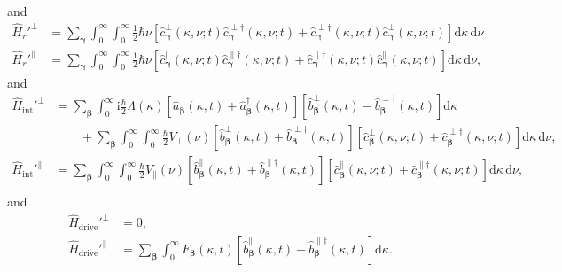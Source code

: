 \documentclass{article}
\begin{document}
and
\begin{equation}
\begin{split}
\hat{H}_r'^\perp &= \sum_{\bm{\gamma}}\int_0^\infty\int_0^\infty\frac{1}{2}\hbar\nu\left[\hat{c}_{\bm{\gamma}}^\perp(\kappa,\nu;t)\hat{c}_{\bm{\gamma}}^{\perp\dagger}(\kappa,\nu;t) + \hat{c}_{\bm{\gamma}}^{\perp\dagger}(\kappa,\nu;t)\hat{c}_{\bm{\gamma}}^\perp(\kappa,\nu;t)\right]\mathrm{d}\kappa\,\mathrm{d}\nu\\
\hat{H}_r'^\parallel &= \sum_{\bm{\gamma}}\int_0^\infty\int_0^\infty\frac{1}{2}\hbar\nu\left[\hat{c}_{\bm{\gamma}}^\parallel(\kappa,\nu;t)\hat{c}_{\bm{\gamma}}^{\parallel\dagger}(\kappa,\nu;t) + \hat{c}_{\bm{\gamma}}^{\parallel\dagger}(\kappa,\nu;t)\hat{c}_{\bm{\gamma}}^\parallel(\kappa,\nu;t)\right]\mathrm{d}\kappa\,\mathrm{d}\nu,
\end{split}
\end{equation}
and
\begin{equation}
\begin{split}
\hat{H}_\mathrm{int}'^\perp &=  \sum_{\bm{\beta}}\int_0^\infty\mathrm{i}\frac{\hbar}{2}\Lambda(\kappa)\left[\hat{a}_{\bm{\beta}}(\kappa,t) + \hat{a}_{\bm{\beta}}^\dagger(\kappa,t)\right]\left[\hat{b}_{\bm{\beta}}^\perp(\kappa,t) - \hat{b}_{\bm{\beta}}^{\perp\dagger}(\kappa,t)\right]\mathrm{d}\kappa\\
&\qquad + \sum_{\bm{\beta}}\int_0^\infty\int_0^\infty\frac{\hbar}{2}V_\perp(\nu)\left[\hat{b}_{\bm{\beta}}^\perp(\kappa,t) + \hat{b}_{\bm{\beta}}^{\perp\dagger}(\kappa,t)\right]\left[\hat{c}_{\bm{\beta}}^\perp(\kappa,\nu;t) + \hat{c}_{\bm{\beta}}^{\perp\dagger}(\kappa,\nu;t)\right]\mathrm{d}\kappa\,\mathrm{d}\nu,\\[1.0em]
\hat{H}_\mathrm{int}'^\parallel &=  \sum_{\bm{\beta}}\int_0^\infty\int_0^\infty\frac{\hbar}{2}V_\parallel(\nu)\left[\hat{b}_{\bm{\beta}}^\parallel(\kappa,t) + \hat{b}_{\bm{\beta}}^{\parallel\dagger}(\kappa,t)\right]\left[\hat{c}_{\bm{\beta}}^\parallel(\kappa,\nu;t) + \hat{c}_{\bm{\beta}}^{\parallel\dagger}(\kappa,\nu;t)\right]\mathrm{d}\kappa\,\mathrm{d}\nu,\\
\end{split}
\end{equation}
and
\begin{equation}
\begin{split}
\hat{H}_\mathrm{drive}'^\perp &= 0,\\
\hat{H}_\mathrm{drive}'^\parallel &= \sum_{\bm{\beta}}\int_0^\infty F_{\bm{\beta}}(\kappa,t)\left[\hat{b}_{\bm{\beta}}^\parallel(\kappa,t) + \hat{b}_{\bm{\beta}}^{\parallel\dagger}(\kappa,t)\right]\mathrm{d}\kappa.
\end{split}
\end{equation}
\end{document}
